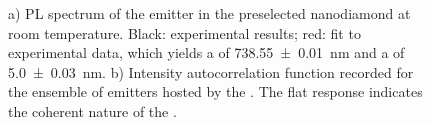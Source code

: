 				\begin{figure}[htp]
					\begin{subfigure}[t]{ 0.49\linewidth}
						\centering
						\caption{}
						\label{subfig::spectrum_nd_multiple}
					\end{subfigure}
					\hfill
					\begin{subfigure}[t]{ 0.49\linewidth}
						\centering
						\caption{}
						\label{subfig::coherent_g2}
					\end{subfigure}
					\caption[Properties of a \nd containing an ensemble of \sivs]{a) PL spectrum of the emitter in the preselected nanodiamond at room temperature. Black: experimental results; red: fit to experimental data, which yields a \ZPL \cwl of \SI[separate-uncertainty = true]{738.55\pm0.01}{nm} and a \lw of \SI[separate-uncertainty = true]{5.0\pm0.03}{nm}. b) Intensity autocorrelation function recorded for the ensemble of emitters hosted by the \nd. The flat response indicates the coherent nature of the \fl.}
				\end{figure}


